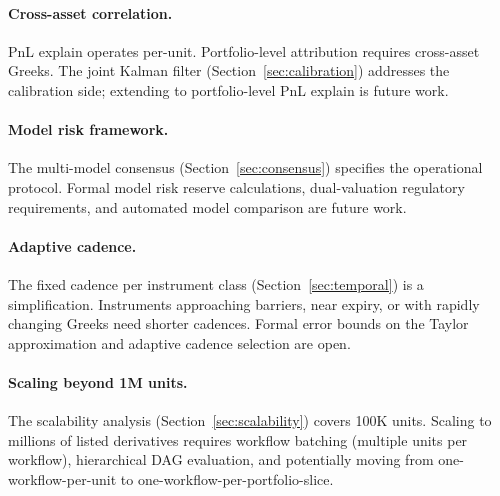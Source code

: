 \documentclass[11pt,a4paper]{article}
\begin{document}
\paragraph{Cross-asset correlation.}  PnL explain operates per-unit.  Portfolio-level attribution requires cross-asset Greeks.  The joint Kalman filter (Section~\ref{sec:calibration}) addresses the calibration side; extending to portfolio-level PnL explain is future work.

\paragraph{Model risk framework.}  The multi-model consensus (Section~\ref{sec:consensus}) specifies the operational protocol.  Formal model risk reserve calculations, dual-valuation regulatory requirements, and automated model comparison are future work.

\paragraph{Adaptive cadence.}  The fixed cadence per instrument class (Section~\ref{sec:temporal}) is a simplification.  Instruments approaching barriers, near expiry, or with rapidly changing Greeks need shorter cadences.  Formal error bounds on the Taylor approximation and adaptive cadence selection are open.

\paragraph{Scaling beyond 1M units.}  The scalability analysis (Section~\ref{sec:scalability}) covers 100K units.  Scaling to millions of listed derivatives requires workflow batching (multiple units per workflow), hierarchical DAG evaluation, and potentially moving from one-workflow-per-unit to one-workflow-per-portfolio-slice.
\end{document}
